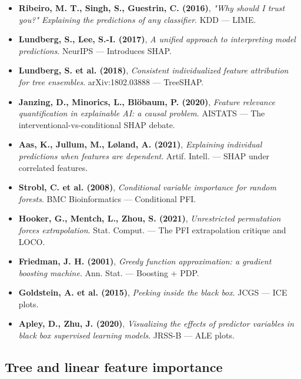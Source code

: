 \documentclass{article}
\providecommand{\tightlist}{\setlength{\itemsep}{0pt}\setlength{\parskip}{0pt}}
\begin{document}
\begin{itemize}
\tightlist
\item
  \textbf{Ribeiro, M. T., Singh, S., Guestrin, C. (2016)}, \emph{"Why
  should I trust you?" Explaining the predictions of any classifier}.
  KDD --- LIME.
\item
  \textbf{Lundberg, S., Lee, S.-I. (2017)}, \emph{A unified approach to
  interpreting model predictions}. NeurIPS --- Introduces SHAP.
\item
  \textbf{Lundberg, S. et al. (2018)}, \emph{Consistent individualized
  feature attribution for tree ensembles}. arXiv:1802.03888 ---
  TreeSHAP.
\item
  \textbf{Janzing, D., Minorics, L., Blöbaum, P. (2020)}, \emph{Feature
  relevance quantification in explainable AI: a causal problem}. AISTATS
  --- The interventional-vs-conditional SHAP debate.
\item
  \textbf{Aas, K., Jullum, M., Løland, A. (2021)}, \emph{Explaining
  individual predictions when features are dependent}. Artif. Intell.
  --- SHAP under correlated features.
\item
  \textbf{Strobl, C. et al. (2008)}, \emph{Conditional variable
  importance for random forests}. BMC Bioinformatics --- Conditional
  PFI.
\item
  \textbf{Hooker, G., Mentch, L., Zhou, S. (2021)}, \emph{Unrestricted
  permutation forces extrapolation}. Stat. Comput. --- The PFI
  extrapolation critique and LOCO.
\item
  \textbf{Friedman, J. H. (2001)}, \emph{Greedy function approximation:
  a gradient boosting machine}. Ann. Stat. --- Boosting + PDP.
\item
  \textbf{Goldstein, A. et al. (2015)}, \emph{Peeking inside the black
  box}. JCGS --- ICE plots.
\item
  \textbf{Apley, D., Zhu, J. (2020)}, \emph{Visualizing the effects of
  predictor variables in black box supervised learning models}. JRSS-B
  --- ALE plots.
\end{itemize}

\subsection{Tree and linear feature
importance}\label{tree-and-linear-feature-importance}
\end{document}
